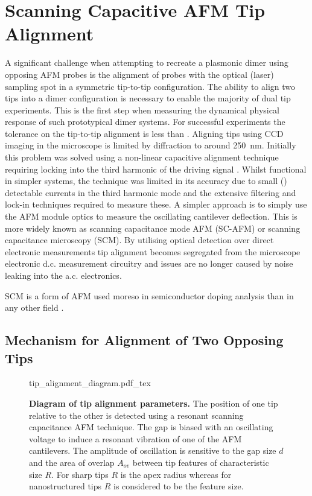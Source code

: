 \documentclass{article}
\begin{document}
\section{Scanning Capacitive AFM Tip Alignment}
\label{sec:tip_alignment}

A significant challenge when attempting to recreate a plasmonic dimer using opposing AFM probes is the alignment of probes with the optical (laser) sampling spot in a symmetric tip-to-tip configuration. The ability to align two tips into a dimer configuration is necessary to enable the majority of dual tip experiments. This is the first step when measuring the dynamical physical response of such prototypical dimer systems.
For successful experiments the tolerance on the tip-to-tip alignment is less than . Aligning tips using CCD imaging in the microscope is limited by diffraction to around {\color{red}\SI{250}{nm}}. Initially this problem was solved using a non-linear capacitive alignment technique requiring locking into the third harmonic of the driving signal \cite{savage2011}. Whilst functional in simpler systems, the technique was limited in its accuracy due to small () detectable currents in the third harmonic mode and the extensive filtering and lock-in techniques required to measure these. A simpler approach is to simply use the AFM module optics to measure the oscillating cantilever deflection. This is more widely known as scanning capacitance mode AFM (SC-AFM) or scanning capacitance microscopy (SCM). By utilising optical detection over direct electronic measurements tip alignment becomes segregated from the microscope electronic d.c. measurement circuitry and issues are no longer caused by noise leaking into the a.c. electronics.

SCM is a form of AFM used moreso in semiconductor doping analysis than in any other field \cite{huang1995quantitative}.

\subsection{Mechanism for Alignment of Two Opposing Tips}

\begin{figure}[h]
\centering
\def\svgwidth{0.65\textwidth}
{tip_alignment_diagram.pdf_tex}
\caption[Diagram of tip alignment parameters]{\textbf{Diagram of tip alignment parameters.} The position of one tip relative to the other is detected using a resonant scanning capacitance AFM technique. The gap is biased with an oscillating voltage to induce a resonant vibration of one of the AFM cantilevers. The amplitude of oscillation is sensitive to the gap size $d$ and the area of overlap $A_{ov}$ between tip features of characteristic size $R$. For sharp tips $R$ is the apex radius whereas for nanostructured tips $R$ is considered to be the feature size.}
\label{fig:tip_alignment_diagram}
\end{figure}
\end{document}

